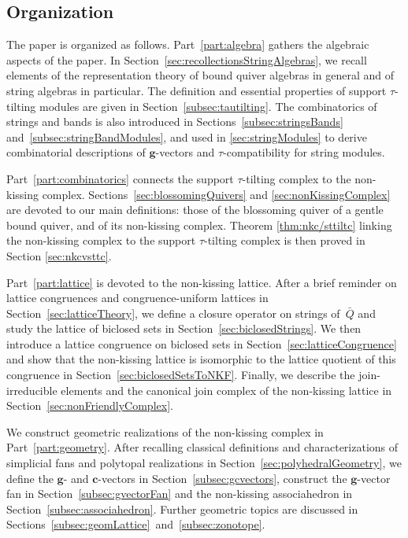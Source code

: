 \documentclass{memo-l}
\theoremstyle{definition}
\renewcommand{\b}[1]{\mathbf{#1}} %
\begin{document}
\subsection*{Organization}

The paper is organized as follows.
Part~\ref{part:algebra} gathers the algebraic aspects of the paper.
In Section~\ref{sec:recollectionsStringAlgebras}, we recall elements of the representation theory of bound quiver algebras in general and of string algebras in particular.
The definition and essential properties of support \mbox{$\tau$-tilting} modules are given in Section~\ref{subsec:tautilting}.  
The combinatorics of strings and bands is also introduced in Sections~\ref{subsec:stringsBands} and~\ref{subsec:stringBandModules}, and used in \ref{sec:stringModules} to derive combinatorial descriptions of $\b{g}$-vectors and $\tau$-compatibility for string modules.

Part~\ref{part:combinatorics} connects the support $\tau$-tilting complex to the non-kissing complex.
Sections~\ref{sec:blossomingQuivers} and \ref{sec:nonKissingComplex} are devoted to our main definitions: those of the blossoming quiver of a gentle bound quiver, and of its non-kissing complex.  
Theorem \ref{thm:nkc/sttiltc} linking the non-kissing complex to the support $\tau$-tilting complex is then proved in Section \ref{sec:nkcvsttc}.

Part~\ref{part:lattice} is devoted to the non-kissing lattice.
After a brief reminder on lattice congruences and congruence-uniform lattices in Section~\ref{sec:latticeTheory}, we define a closure operator on strings of~$\bar Q$ and study the lattice of biclosed sets in Section~\ref{sec:biclosedStrings}.
We then introduce a lattice congruence on biclosed sets in Section~\ref{sec:latticeCongruence} and show that the non-kissing lattice is isomorphic to the lattice quotient of this congruence in Section~\ref{sec:biclosedSetsToNKF}.
Finally, we describe the join-irreducible elements and the canonical join complex of the non-kissing lattice in Section~\ref{sec:nonFriendlyComplex}.

We construct geometric realizations of the non-kissing complex in Part~\ref{part:geometry}.
After recalling classical definitions and characterizations of simplicial fans and polytopal realizations in Section~\ref{sec:polyhedralGeometry}, we define the $\b{g}$- and $\b{c}$-vectors in Section~\ref{subsec:gcvectors}, construct the $\b{g}$-vector fan in Section~\ref{subsec:gvectorFan} and the non-kissing associahedron in Section~\ref{subsec:associahedron}.
Further geometric topics are discussed in Sections~\ref{subsec:geomLattice}~and~\ref{subsec:zonotope}.
\end{document}
